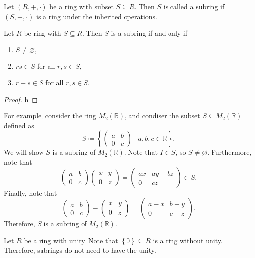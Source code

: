 \begin{definition}[Subring]\label{dfn:Subring}
	Let $(R,+,\cdot )$ be a ring with subset $S\subseteq R$. Then $S$ is called a subring if $(S,+,\cdot )$ is a ring under the inherited operations.
\end{definition}
\begin{proposition}
	Let $R$ be ring with $S\subseteq R$. Then $S$ is a subring if and only if
	\begin{enumerate}
		\item $S\neq \varnothing$,
		\item $rs\in S$ for all $r,s\in S$,
		\item $r-s\in S$ for all $r,s\in S$.
	\end{enumerate}
\end{proposition}
\begin{proof}
	h
\end{proof}
For example, consider the ring $M_2(\mathbb{R})$, and condiser the subset $S\subseteq M_2(\mathbb{R})$ defined as
\[
	S\coloneqq \left\{ \begin{pmatrix}
			a&b\\
			0&c
	\end{pmatrix}  \mid a,b,c\in\mathbb{R} \right\} 
.\]
We will show $S$ is a subring of $M_2(\mathbb{R})$. Note that $I\in S$, so $S\neq \varnothing$. Furthermore, note that
\[
	\begin{pmatrix}
		a&b\\
		0&c
	\end{pmatrix} \begin{pmatrix}
		x&y\\
		0&z
	\end{pmatrix} =\begin{pmatrix}
		ax&ay+bz\\
		0&cz
	\end{pmatrix} \in S
.\]
Finally, note that
\[
	\begin{pmatrix}
		a&b\\
		0&c
	\end{pmatrix}- \begin{pmatrix}
		x&y\\
		0&z
	\end{pmatrix} =\begin{pmatrix}
		a-x&b-y\\
		0&c-z
	\end{pmatrix} 
.\]
Therefore, $S$ is a subring of $M_2(\mathbb{R})$.
\begin{remark}
	Let $R$ be a ring with unity. Note that $\left\{ 0 \right\} \subseteq R$ is a ring without unity. Therefore, subrings do not need to have the unity.
\end{remark}
